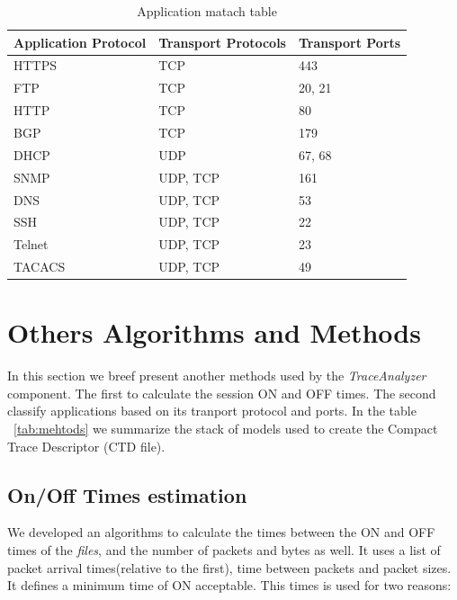 \begin{table}[ht!]
	\centering
	\caption{Application matach table}
	\label{tab:application-protocols}
	\begin{tabular}{lll}
		\hline
		Application Protocol & Transport Protocols & Transport Ports \\ \hline
		HTTPS               & TCP                & 443             \\
		FTP                 & TCP                & 20, 21          \\
		HTTP                & TCP                & 80              \\
		BGP                 & TCP                & 179             \\
		DHCP                & UDP                & 67, 68          \\
		SNMP                & UDP, TCP           & 161             \\
		DNS                 & UDP, TCP           & 53              \\
		SSH                 & UDP, TCP           & 22              \\
		Telnet              & UDP, TCP           & 23              \\
		TACACS              & UDP, TCP           & 49              \\ \hline
	\end{tabular}
\end{table}


\section{Others Algorithms and Methods}

In this section we breef present another methods used by the \textit{TraceAnalyzer} component. The first to calculate the session ON and OFF times. The second classify applications based on its tranport protocol and ports. In the table ~\ref{tab:mehtods} we summarize the stack of models used to create the Compact Trace Descriptor (CTD file). 


\subsection{On/Off Times estimation}


We developed an algorithms to calculate the times between the ON and OFF times of the \textit{files}, and the number of packets and bytes as well. It uses a list of packet arrival times(relative to the first), time between packets and packet sizes. It defines a minimum time of ON acceptable. This times is used for two reasons:

